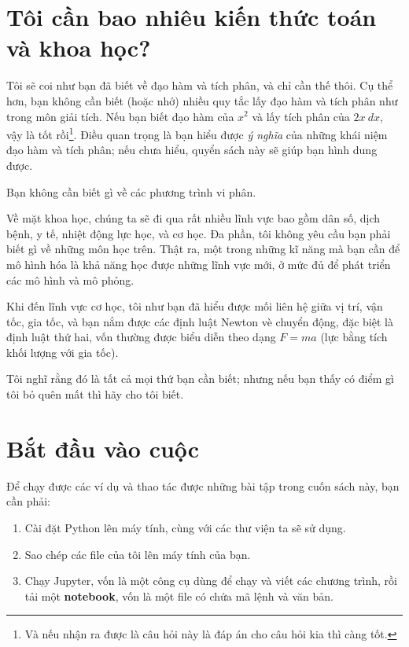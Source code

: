\documentclass[12pt, openany]{book}
\theoremstyle{exercise}
\begin{document}
\section{Tôi cần bao nhiêu kiến thức toán và khoa học?} 

Tôi sẽ coi như bạn đã biết về đạo hàm và tích phân, và chỉ cần thế thôi. Cụ thể hơn, bạn không cần biết (hoặc nhớ) nhiều quy tắc lấy đạo hàm và tích phân như trong môn giải tích. Nếu bạn biết đạo hàm của $x^2$ và lấy tích phân của $2x~dx$, vậy là tốt rồi\footnote{Và nếu nhận ra được là câu hỏi này là đáp án cho câu hỏi kia thì càng tốt.}.  Điều quan trọng là bạn hiểu được {\em ý nghĩa} của những khái niệm đạo hàm và tích phân; nếu chưa hiểu, quyển sách này sẽ giúp bạn hình dung được.


Bạn không cần biết gì về các phương trình vi phân.

Về mặt khoa học, chúng ta sẽ đi qua rất nhiều lĩnh vực bao gồm dân số, dịch bệnh, y tế, nhiệt động lực học, và cơ học. Đa phần, tôi không yêu cầu bạn phải biết gì về những môn học trên. Thật ra, một trong những kĩ năng mà bạn cần để mô hình hóa là khả năng học được những lĩnh vực mới, ở mức đủ để phát triển các mô hình và mô phỏng.

Khi đến lĩnh vực cơ học, tôi như bạn đã hiểu được mối liên hệ giữa vị trí, vận tốc, gia tốc, và bạn nắm được các định luật Newton vè chuyển động, đặc biệt là định luật thứ hai, vốn thường được biểu diễn theo dạng $F = ma$ (lực bằng tích khối lượng với gia tốc).


Tôi nghĩ rằng đó là tất cả mọi thứ bạn cần biết; nhưng nếu bạn thấy có điểm gì tôi bỏ quên mất thì hãy cho tôi biết.


\section{Bắt đầu vào cuộc}
\label{code}

Để chạy được các ví dụ và thao tác được những bài tập trong cuốn sách này, bạn cần phải:

\begin{enumerate}

\item Cài đặt Python lên máy tính, cùng với các thư viện ta sẽ sử dụng.

\item Sao chép các file của tôi lên máy tính của bạn.

\item Chạy Jupyter, vốn là một công cụ dùng để chạy và viết các chương trình, rồi tải một {\bf notebook}, vốn là một file có chứa mã lệnh và văn bản.

\end{enumerate}
\end{document}
